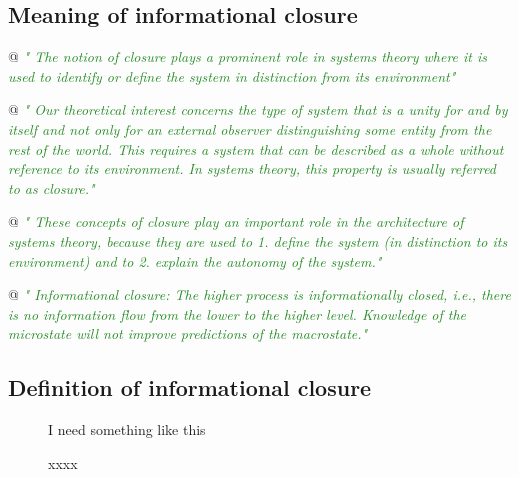 \documentclass[utf8]{article}
\newenvironment{ants}
			{
			 \begin{easylist}[itemize]		
		 	}
			{
			\end{easylist}
			}
\newcommand{\rewrite}[1]{\textcolor{ForestGreen}{\textit{"#1"}}\newline}
\newcommand{\includegraphicsTodo}[2][]{%
			\tcbox[%
				adjusted title=\LARGE To Be Modified,
				halign title=right,
				colbacktitle=Orange!75!White,
				coltitle=Black,
				colframe=Red!60!White,
				boxrule=1mm,
				colback=white%
				]{\texttt{[image: \#2]}}}
\begin{document}
		\subsection{Meaning of informational closure}
			\begin{ants}
				@ \rewrite{
					The notion of closure plays a prominent role in systems theory where it is used to identify or define the system in distinction from its environment} \cite{BERTSCHINGER.2006}
		
				@ \rewrite{
					Our theoretical interest concerns the type of system that is a unity for and by itself and not only for an external observer distinguishing some entity from the rest of the world. This requires a system that can be described as a whole without reference to its environment. In systems theory, this property is usually referred to as closure.}\citep{BERTSCHINGER.2006}
				
				@ \rewrite{
					These concepts of closure play an important role in the architecture of systems
					theory, because they are used to
					1. define the system (in distinction to its environment) and to 
					2. explain the autonomy of the system.}\citep{BERTSCHINGER.2006}
				
				@ \rewrite{
					Informational closure: The higher process is informationally closed, i.e., there is no information flow from the lower to the higher level. Knowledge of the microstate will not improve predictions of the macrostate.} \citep[p. 4]{PFANTE.2014}
				
								
			\end{ants}
	
	
		\subsection{Definition of informational closure}
		
			\begin{figure}
				\includegraphicsTodo[width=\textwidth]{WritingMaterials/PDFXCview_2018-06-07_17-45-59.png} 
				\cite{BERTSCHINGER.2006} I need something like this 
				\caption{xxxx}
				\label{fig:AgentAndEnv}			
			\end{figure}
\end{document}
